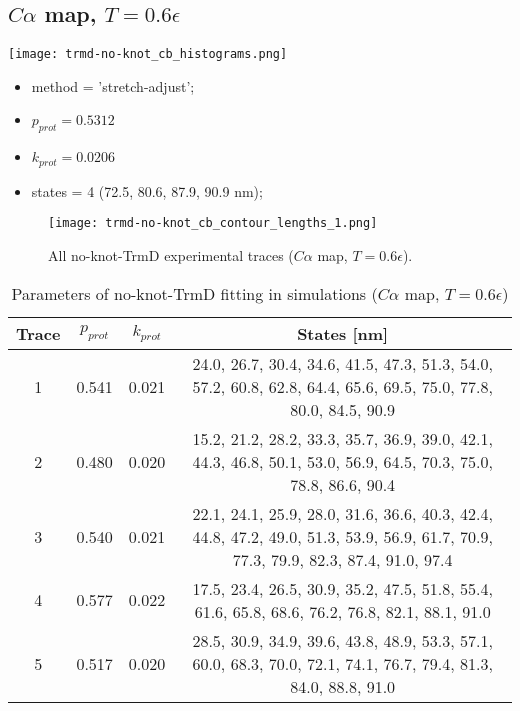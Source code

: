 \subsection{$C\alpha$ map, $T=0.6\epsilon$}
\label{subsec:no-knot-trmd-cb}
\begin{minipage}[c]{0.7\textwidth}
    \texttt{[image: trmd-no-knot\_cb\_histograms.png]}
\end{minipage}
\hfill
\begin{minipage}[c]{0.45\textwidth}
    \begin{itemize}
        \item method = 'stretch-adjust';
        \item $p_{prot}=0.5312$
        \item $k_{prot}=0.0206$
        \item states = 4 (72.5, 80.6, 87.9, 90.9 nm);
    \end{itemize}
\end{minipage}

\begin{figure}
    \centering
    \texttt{[image: trmd-no-knot\_cb\_contour\_lengths\_1.png]}
    \caption{All no-knot-TrmD experimental traces ($C\alpha$ map, $T=0.6\epsilon$).}
    \label{fig:no-knot-trmd-cb-cl1}
\end{figure}

\begin{table}
    \tiny
    \centering
    \caption{Parameters of no-knot-TrmD fitting in simulations ($C\alpha$ map, $T=0.6\epsilon$)}
    \label{tab:no-knot-trmd-cb-parameters}
    \begin{tabular}{c|c|c|c}
        \textbf{Trace} & \textbf{$p_{prot}$} & \textbf{$k_{prot}$} & \textbf{States [nm]}\\\hline
        1 & 0.541 & 0.021 & 24.0, 26.7, 30.4, 34.6, 41.5, 47.3, 51.3, 54.0, 57.2, 60.8, 62.8, 64.4, 65.6, 69.5, 75.0, 77.8, 80.0, 84.5, 90.9\\
        2 & 0.480 & 0.020 & 15.2, 21.2, 28.2, 33.3, 35.7, 36.9, 39.0, 42.1, 44.3, 46.8, 50.1, 53.0, 56.9, 64.5, 70.3, 75.0, 78.8, 86.6, 90.4\\
        3 & 0.540 & 0.021 & 22.1, 24.1, 25.9, 28.0, 31.6, 36.6, 40.3, 42.4, 44.8, 47.2, 49.0, 51.3, 53.9, 56.9, 61.7, 70.9, 77.3, 79.9, 82.3, 87.4, 91.0, 97.4\\
        4 & 0.577 & 0.022 & 17.5, 23.4, 26.5, 30.9, 35.2, 47.5, 51.8, 55.4, 61.6, 65.8, 68.6, 76.2, 76.8, 82.1, 88.1, 91.0\\
        5 & 0.517 & 0.020 & 28.5, 30.9, 34.9, 39.6, 43.8, 48.9, 53.3, 57.1, 60.0, 68.3, 70.0, 72.1, 74.1, 76.7, 79.4, 81.3, 84.0, 88.8, 91.0\\
    \end{tabular}
\end{table}

